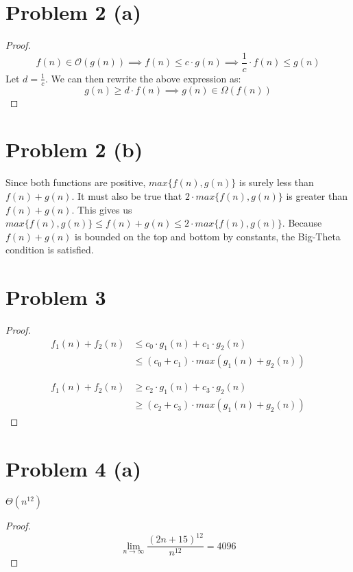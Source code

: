 \documentclass{article}
\newenvironment{problem}[1]{
  \nobreak\section*{Problem #1}
}{}
\newcommand*{\bigO}[1]{\ensuremath{\mathcal{O}\left(#1\right)}}
\newcommand*{\bigOmega}[1]{\ensuremath{\Omega\left(#1\right)}}
\newcommand*{\bigTheta}[1]{\ensuremath{\Theta\left(#1\right)}}
\begin{document}
  \begin{problem}{2 (a)}
    \begin{proof}
      \begin{equation*}
          f(n) \in \bigO{g(n)} \implies f(n) \le c \cdot g(n) \implies \frac{1}{c} \cdot f(n) \le g(n)
      \end{equation*}
      Let $d = \frac{1}{c}$.  We can then rewrite the above expression as:
      \begin{equation*}
        g(n) \ge d \cdot f(n) \implies g(n) \in \bigOmega{f(n)}
      \end{equation*} 
    \end{proof}
  \end{problem}

  \begin{problem}{2 (b)}
    Since both functions are positive, $max \{f(n), g(n)\}$ is surely less than
    $f(n) + g(n)$.  It must also be true that $2 \cdot max \{f(n), g(n)\}$ is greater
    than $f(n) + g(n)$.  This gives us $max \{f(n), g(n)\} \le f(n) + g(n) \le 2 \cdot max \{f(n), g(n)\}$.
    Because $f(n) + g(n)$ is bounded on the top and bottom by constants, the Big-Theta condition is satisfied.
  \end{problem}

  \begin{problem}{3}
    \begin{proof}
      \begin{equation*}
        \begin{split}
          f_1(n) + f_2(n) & \le c_0 \cdot g_1(n) + c_1 \cdot g_2(n) \\
          & \le (c_0 + c_1) \cdot max(g_1(n) + g_2(n))
        \end{split}
      \end{equation*}

      \begin{equation*}
        \begin{split}
          f_1(n) + f_2(n) & \ge c_2 \cdot g_1(n) + c_3 \cdot g_2(n) \\
          & \ge (c_2 + c_3) \cdot max(g_1(n) + g_2(n))
        \end{split}
      \end{equation*}
    \end{proof}
  \end{problem}

  \begin{problem}{4 (a)}
    \begin{center}
      \bigTheta{n^{12}}
    \end{center}

    \begin{proof}
      \begin{equation*}
        \lim_{n\to\infty} \frac{(2n + 15)^{12}}{n^{12}} = 4096
      \end{equation*}
    \end{proof}
  \end{problem}
\end{document}
